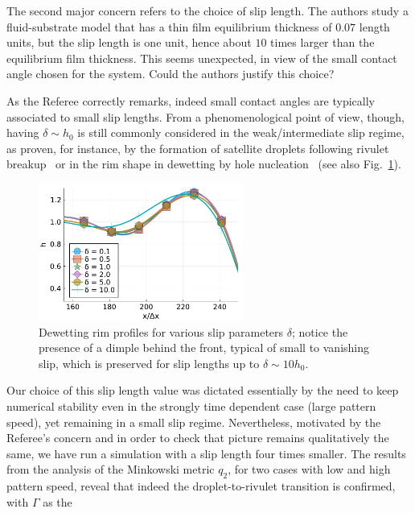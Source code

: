 \documentclass[12pt,english]{article}
\begin{document}
\begin{itemize}
{\item[ \textbf{\underline{Comment 2.}}]
The second major concern refers to the choice of slip length. 
The authors study a fluid-substrate model that has a thin film equilibrium thickness of 
$0.07$ length units, but the slip length is one unit, hence about $10$ times larger than the equilibrium film thickness. 
This seems unexpected, in view of the small contact angle chosen for the system. 
Could the authors justify this choice?
}

\item[ \textbf{Answer}]
{
As the Referee correctly remarks, indeed small contact angles are typically associated to small slip lengths. From a phenomenological point of view, 
though, having $\delta \sim h_0$ is still commonly considered in the weak/intermediate slip regime, as proven, for instance, 
by the formation of satellite 
droplets following rivulet breakup~\cite{peschka2019signatures} or 
in the rim shape in dewetting by hole nucleation~\cite{fetzer2007quantifying, munch2005lubrication} (see also Fig.~\ref{fig:slip}).
\begin{figure}
    \centering
    \includegraphics [width=0.6\textwidth]{slip_measure.pdf}
    \caption{Dewetting rim profiles for various slip parameters $\delta$; notice the presence of a dimple behind the front, typical of 
    small to vanishing slip, which is preserved for slip lengths up to 
    $\delta \sim 10 h_0$.}
    \label{fig:slip}
\end{figure}
Our choice of this slip length value was dictated essentially by the need 
to keep numerical stability even in the strongly time dependent case 
(large pattern speed), yet remaining in a small slip regime. 
Nevertheless, motivated by the Referee's concern and in order to check that 
picture remains qualitatively the same, we have run a simulation with 
a slip length four times smaller. The results from the analysis of the Minkowski metric $q_2$, for two cases with low and high pattern speed, reveal that indeed
the droplet-to-rivulet transition is confirmed, with $\Gamma$ as the 
}
\end{itemize}
\end{document}
